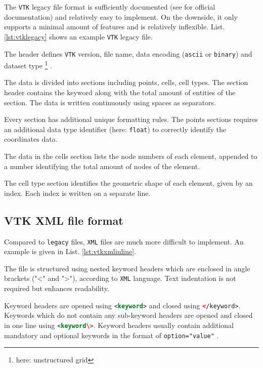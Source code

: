 The \texttt{VTK} legacy file format is sufficiently documented (see \cite{Kit} for official documentation) and relatively easy to implement. On the downside, it only supports a minimal amount of features and is relatively inflexible. List. \ref{lst:vtklegacy} shows an example \texttt{VTK} legacy file. 

\bigbreak
The header defines \texttt{VTK} version, file name, data encoding (\texttt{ascii} or \texttt{binary}) and dataset type \footnote{here: unstructured grid} \cite{Kit}.

\bigbreak
The data is divided into sections including points, cells, cell types. The section header contains the keyword along with the total amount of entities of the section. The data is written continuously using spaces as separators. \cite{Kit}

\bigbreak
Every section has additional unique formatting rules. The points sections requires an additional data type identifier (here: \lstinline{float}) to correctly identify the coordinates data. \cite{Kit}

\bigbreak
The data in the cells section lists the node numbers of each element, appended to a number identifying the total amount of nodes of the element. \cite{Kit}

\bigbreak
The cell type section identifies the geometric shape of each element, given by an index. Each index is written on a separate line. \cite{Kit}

\subsection{VTK XML file format}
\label{subsec:VTKXMLfileformat}

Compared to \texttt{legacy} files, \texttt{XML} files are much more difficult to implement. An example is given in List. \ref{lst:vtkxmlinline}. 

\bigbreak
The file is structured using nested keyword headers which are enclosed in angle brackets ("<" and ">"), according to \texttt{XML} language. Text indentation is not required but enhances readability.

\bigbreak
Keyword headers are opened using \lstinline[language=XML]{<keyword>} and closed using \lstinline[language=XML]{</keyword>}. Keywords which do not contain any sub-keyword headers are opened and closed in one line using \lstinline[language=XML]{<keyword\>}. Keyword headers usually contain additional mandatory and optional keywords in the format of \lstinline[language=XML]{option="value"} \cite{Kit}.

